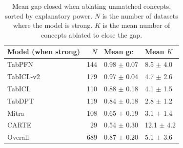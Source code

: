 \begin{table}[h]
\centering
\small
\caption{Mean gap closed when ablating unmatched concepts, sorted by explanatory power. $N$ is the number of datasets where the model is strong. $K$ is the mean number of concepts ablated to close the gap.}
\label{tab:ablation_summary}
\begin{tabular}{lrll}
\toprule
Model (when strong) & $N$ & Mean gc & Mean $K$ \\
\midrule
TabPFN & 144 & 0.98 $\pm$ 0.07 & 8.5 $\pm$ 4.0 \\
TabICL-v2 & 179 & 0.97 $\pm$ 0.04 & 4.7 $\pm$ 2.6 \\
TabICL & 110 & 0.88 $\pm$ 0.18 & 4.1 $\pm$ 1.5 \\
TabDPT & 119 & 0.84 $\pm$ 0.18 & 2.8 $\pm$ 1.2 \\
Mitra & 108 & 0.65 $\pm$ 0.19 & 3.1 $\pm$ 1.4 \\
CARTE & 29 & 0.54 $\pm$ 0.30 & 12.1 $\pm$ 4.2 \\
\midrule
Overall & 689 & 0.87 $\pm$ 0.20 & 5.1 $\pm$ 3.6 \\
\bottomrule
\end{tabular}
\end{table}
